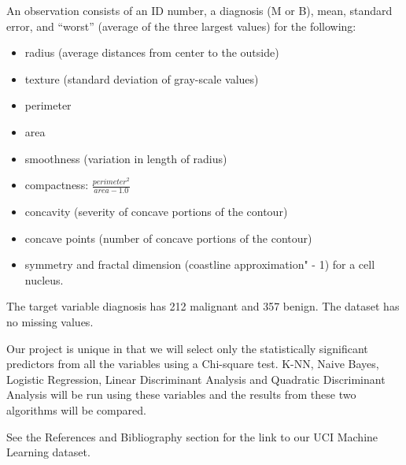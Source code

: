 \documentclass[15pt]{cup-pan}
\begin{document}
\begin{adjustwidth*}{-1.5in}{-0in}
\bigskip

\noindent An observation consists of an ID number, a diagnosis (M or B), mean, standard error, and “worst” (average of the three largest values) for the following:
\begin{itemize}
\item radius (average distances from center to the outside)
\item texture (standard deviation of gray-scale values)
\item perimeter
\item area
\item smoothness (variation in length of radius)
\item compactness: $ \frac{perimeter^2}{area - 1.0}$ 
\item concavity (severity of concave portions of the contour)
\item concave points (number of concave portions of the contour)
\item symmetry and fractal dimension (coastline approximation" - 1) for a cell nucleus. 
\end{itemize}

\bigskip

\noindent The target variable diagnosis has 212 malignant and 357 benign. The dataset has no missing values.   

\bigskip

Our project is unique in that we will select only the statistically significant predictors from all the variables using a Chi-square test. K-NN, Naive Bayes, Logistic Regression, Linear Discriminant Analysis and Quadratic Discriminant Analysis will be run using these variables and the results from these two algorithms will be compared. %
 
 






See the References and Bibliography section for the link to our UCI Machine Learning dataset. 



\end{adjustwidth*}
\end{document}
